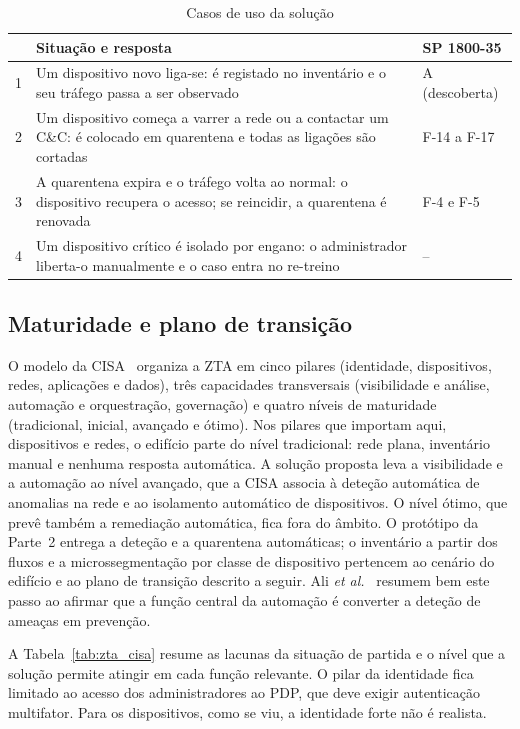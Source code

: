 \documentclass[conference,a4paper]{IEEEtran}
\begin{document}
\begin{table}[H]
\caption{Casos de uso da solução}\label{tab:zta_casos}
\centering\footnotesize
\begin{tabular}{@{}p{}p{}p{}@{}}
\toprule
& Situação e resposta & SP 1800-35 \\
\midrule
1 & Um dispositivo novo liga-se: é registado no inventário e o seu tráfego passa a ser observado & A (descoberta) \\
2 & Um dispositivo começa a varrer a rede ou a contactar um C\&C: é colocado em quarentena e todas as ligações são cortadas & F-14 a F-17 \\
3 & A quarentena expira e o tráfego volta ao normal: o dispositivo recupera o acesso; se reincidir, a quarentena é renovada & F-4 e F-5 \\
4 & Um dispositivo crítico é isolado por engano: o administrador liberta-o manualmente e o caso entra no re-treino & -- \\
\bottomrule
\end{tabular}
\end{table}

\subsection{Maturidade e plano de transição}
O modelo da CISA~\cite{cisa2023ztmm} organiza a ZTA em cinco pilares (identidade,
dispositivos, redes, aplicações e dados), três capacidades transversais (visibilidade e
análise, automação e orquestração, governação) e quatro níveis de maturidade
(tradicional, inicial, avançado e ótimo). Nos pilares que importam aqui, dispositivos e
redes, o edifício parte do nível tradicional: rede plana, inventário manual e nenhuma
resposta automática. A solução proposta leva a visibilidade e a automação ao nível
avançado, que a CISA associa à deteção automática de anomalias na rede e ao isolamento
automático de dispositivos. O nível ótimo, que prevê também a remediação automática, fica
fora do âmbito. O protótipo da Parte~2 entrega a deteção e a quarentena automáticas; o
inventário a partir dos fluxos e a microssegmentação por classe de dispositivo pertencem
ao cenário do edifício e ao plano de transição descrito a seguir.
Ali \textit{et al.}~\cite{ali2022maturity} resumem bem este passo ao afirmar que a função
central da automação é converter a deteção de ameaças em prevenção.

A Tabela~\ref{tab:zta_cisa} resume as lacunas da situação de partida e o nível que a
solução permite atingir em cada função relevante. O pilar da identidade fica limitado ao
acesso dos administradores ao PDP, que deve exigir autenticação multifator. Para os
dispositivos, como se viu, a identidade forte não é realista.
\end{document}
